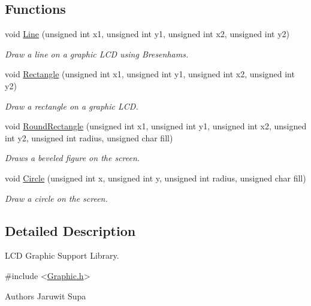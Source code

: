 \subsection*{Functions}
\begin{DoxyCompactItemize}
\item 
void \hyperlink{group___l_c_d_library_ga4999ab642f55d64b5e4e614ccb2752cd}{Line} (unsigned int x1, unsigned int y1, unsigned int x2, unsigned int y2)
\begin{DoxyCompactList}\small\item\em Draw a line on a graphic L\+C\+D using Bresenham\textquotesingle{}s. \end{DoxyCompactList}\item 
void \hyperlink{group___l_c_d_library_ga7fe61e0d7f105ae26b8199ca361c58f1}{Rectangle} (unsigned int x1, unsigned int y1, unsigned int x2, unsigned int y2)
\begin{DoxyCompactList}\small\item\em Draw a rectangle on a graphic L\+C\+D. \end{DoxyCompactList}\item 
void \hyperlink{group___l_c_d_library_ga9584a175765628382707bdc8397c0e2b}{Round\+Rectangle} (unsigned int x1, unsigned int y1, unsigned int x2, unsigned int y2, unsigned int radius, unsigned char fill)
\begin{DoxyCompactList}\small\item\em Draws a beveled figure on the screen. \end{DoxyCompactList}\item 
void \hyperlink{group___l_c_d_library_ga94223e7939b705919cbf0cb9434e5fb8}{Circle} (unsigned int x, unsigned int y, unsigned int radius, unsigned char fill)
\begin{DoxyCompactList}\small\item\em Draw a circle on the screen. \end{DoxyCompactList}\end{DoxyCompactItemize}


\subsection{Detailed Description}
L\+C\+D Graphic Support Library. 


\begin{DoxyCode}
\textcolor{preprocessor}{#include <\hyperlink{_graphic_8h}{Graphic.h}>} 
\end{DoxyCode}


\begin{DoxyAuthor}{Authors}
Jaruwit Supa 
\end{DoxyAuthor}


